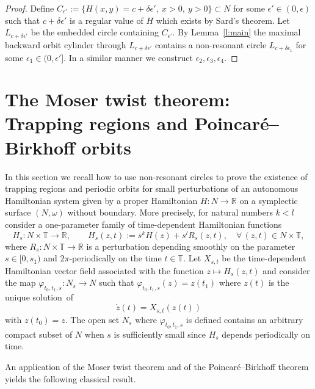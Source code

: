 \documentclass[10pt]{amsart}
\theoremstyle{definition}
\newcommand{\R}{\mathbb{R}}
\newcommand{\T}{\mathbb{T}}
\let\oldforall\forall
\renewcommand*{\forall}{\mathrel{\oldforall}}
\begin{document}
\begin{proof}
Define $C_{\epsilon'}:=\{H(x,y)=c+\delta\epsilon',\ x>0,\ y>0\}\subset N$ for some $\epsilon'\in(0,\epsilon)$ such that $c+\delta\epsilon'$ is a regular value of $H$ which exists by Sard's theorem. Let $L_{c+\delta\epsilon'}$ be the embedded circle containing $C_{\epsilon'}$. By Lemma~\ref{l:main} the maximal backward orbit cylinder through $L_{c+\delta\epsilon'}$ contains a non-resonant circle $L_{c+\delta\epsilon_1}$ for some $\epsilon_1\in(0,\epsilon']$. In a similar manner we construct $\epsilon_2,\epsilon_3,\epsilon_4$.
\end{proof}



\section{The Moser twist theorem: Trapping regions and Poincaré--Birkhoff orbits}
\label{s:Moser}

In this section we recall how to use non-resonant circles to prove the existence of trapping regions and periodic orbits for small perturbations of an autonomous Hamiltonian system given by a proper Hamiltonian $H:N\to\R$ on a symplectic surface $(N,\omega)$ without boundary. More precisely, for natural numbers $k<l$ consider a one-parameter family of time-dependent Hamiltonian functions
\begin{equation}\label{e:Hs}
H_s:N\times\T\to\R,\qquad H_s(z,t):=s^kH(z)+s^lR_s(z,t),\quad \forall\,(z,t)\in N\times \T,
\end{equation}
where $R_s:N\times \T\to\R$ is a perturbation depending smoothly on the parameter $s\in[0,s_1)$ and $2\pi$-periodically on the time $t\in\T$. Let $X_{s,t}$ be the time-dependent Hamiltonian vector field associated with the function $z\mapsto H_s(z,t)$ and consider the map $\varphi_{t_0,t_1,s}:N_s\to N$ such that $\varphi_{t_0,t_1,s}(z)=z(t_1)$ where $z(t)$ is the unique solution~of
\begin{equation}\label{e:nonaut}
\dot z(t)=X_{s,t}(z(t))
\end{equation}
with $z(t_0)=z$. The open set $N_s$ where $\varphi_{t_0,t_1,s}$ is defined contains an arbitrary compact subset of $N$ when $s$ is sufficiently small since $H_s$ depends periodically on time.

An application of the Moser twist theorem and of the Poincaré--Birkhoff theorem yields the following classical result.
\end{document}
